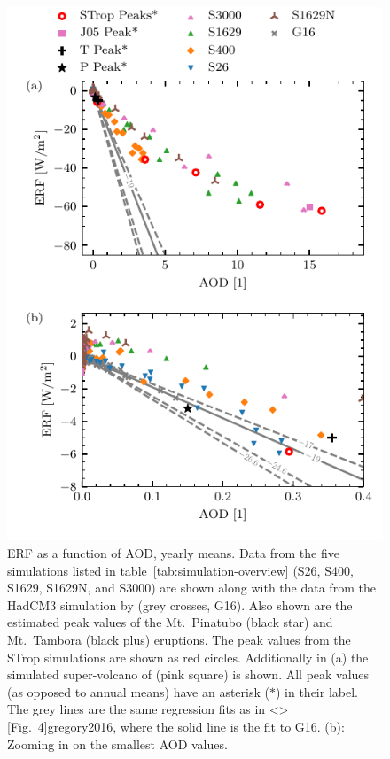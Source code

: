 \documentclass[draft]{agujournal2019}
\begin{document}
  \begin{figure}
    \centering \includegraphics{figure2}

    \caption{ERF as a function of AOD, yearly means. Data from the five simulations
      listed in table~\ref{tab:simulation-overview} (S26, S400, S1629, S1629N, and
      S3000) are shown along with the data from the HadCM3 simulation by
       (grey crosses, G16). Also shown are the estimated peak values
      of the Mt.\ Pinatubo (black star) and Mt.\ Tambora (black plus) eruptions. The
      peak values from the STrop simulations are shown as red circles. Additionally in
      (a) the simulated super-volcano of  (pink square) is shown. All
      peak values (as opposed to annual means) have an asterisk (\(\ast{}\)) in their
      label. The grey lines are the same regression fits as in \citeA<>[Fig.\
        4]{gregory2016}, where the solid line is the fit to G16. (b): Zooming in on the
      smallest AOD values.}\label{fig:2_rf_vs_aod_slopes}%
  \end{figure}
\end{document}
